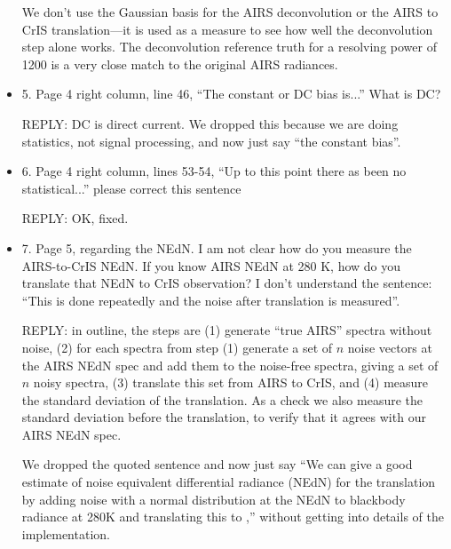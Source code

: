 \documentclass[11pt]{article}
\newcommand {\reply} {\mbox{\small REPLY}}
\begin{document}
\begin{itemize}
    We don't use the Gaussian basis for the AIRS deconvolution or
    the AIRS to CrIS translation---it is used as a measure to see
    how well the deconvolution step alone works.  The deconvolution
    reference truth for a resolving power of 1200 is a very close
    match to the original AIRS radiances.

  \item 5. Page 4 right column, line 46, ``The constant or DC bias
    is...''  What is DC?

    \reply: DC is direct current.  We dropped this because we are
    doing statistics, not signal processing, and now just say ``the
    constant bias''.

  \item 6. Page 4 right column, lines 53-54, ``Up to this point
    there as been no statistical...'' please correct this sentence

    \reply: OK, fixed.

  \item 7. Page 5, regarding the NEdN. I am not clear how do you
    measure the AIRS-to-CrIS NEdN. If you know AIRS NEdN at 280 K,
    how do you translate that NEdN to CrIS observation? I don’t
    understand the sentence: ``This is done repeatedly and the noise
    after translation is measured''.

    \reply: in outline, the steps are (1) generate ``true AIRS''
    spectra without noise, (2) for each spectra from step (1)
    generate a set of $n$ noise vectors at the AIRS NEdN spec and
    add them to the noise-free spectra, giving a set of $n$ noisy
    spectra, (3) translate this set from AIRS to CrIS, and (4)
    measure the standard deviation of the translation.  As a check
    we also measure the standard deviation before the translation,
    to verify that it agrees with our AIRS NEdN spec.

    We dropped the quoted sentence and now just say
    ``We can give a good estimate of noise equivalent differential
    radiance (NEdN) for the translation by adding noise with a
    normal distribution at the {\airs} NEdN to blackbody radiance at
    280K and translating this to {\cris},'' without getting into
    details of the implementation.

\end{itemize}
\end{document}
